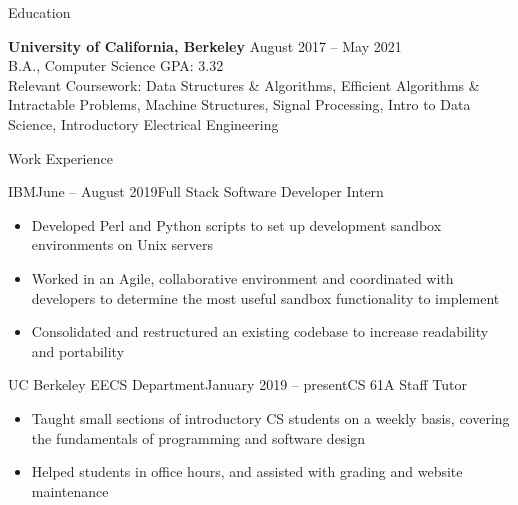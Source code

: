 \documentclass{resume} %
\begin{document}

\begin{rSection}{Education}

{\bf University of California, Berkeley} \hfill {August 2017 -- May 2021} 
\\ B.A., Computer Science \hfill {GPA: 3.32}
\\ Relevant Coursework: Data Structures \& Algorithms, Efficient Algorithms \& Intractable Problems, Machine Structures, Signal Processing, Intro to Data Science, Introductory Electrical Engineering



\end{rSection}
\renewcommand\labelitemi{{\boldmath$\cdot$}}


\begin{rSection}{Work Experience}

\begin{rSubsection}{IBM}{June -- August 2019}{Full Stack Software Developer Intern}{}
\begin{itemize}
    \item Developed Perl and Python scripts to set up development sandbox environments on Unix servers
    \item Worked in an Agile, collaborative environment and coordinated with developers to determine the most useful sandbox functionality to implement
    \item Consolidated and restructured an existing codebase to increase readability and portability
\end{itemize}
\end{rSubsection}

\begin{rSubsection}{UC Berkeley EECS Department}{January 2019 -- present}{CS 61A Staff Tutor}{}
\begin{itemize}
    \item Taught small sections of introductory CS students on a weekly basis, covering the fundamentals of programming and software design
    \item Helped students in office hours, and assisted with grading and website maintenance
\end{itemize}

\end{rSubsection}


\end{rSection}
\end{document}
